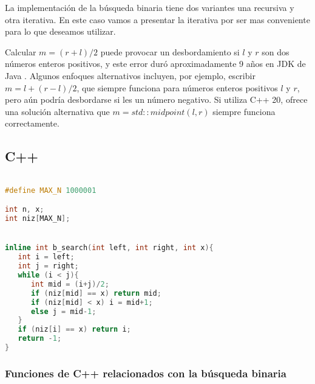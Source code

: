 La implementación de la búsqueda binaria tiene dos variantes una recursiva y otra iterativa. En este caso vamos a presentar la iterativa por ser mas conveniente para lo que deseamos utilizar.

Calcular  $m = (r + l) / 2$ puede provocar un desbordamiento si $l$ y $r$ son dos números enteros positivos, y este error duró aproximadamente 9 años en JDK de Java . Algunos enfoques alternativos incluyen, por ejemplo, escribir $m = l + (r - l) / 2$, que siempre funciona para números enteros positivos $l$ y $r$, pero aún podría desbordarse si les un número negativo. Si utiliza C++ 20, ofrece una solución alternativa que $m = std::midpoint(l, r)$ siempre funciona correctamente.

\subsection{C++}
\lstset{language=C++, breaklines=true, basicstyle=\footnotesize}
\begin{lstlisting}[language=C++]

#define MAX_N 1000001

int n, x;
int niz[MAX_N];


inline int b_search(int left, int right, int x){
   int i = left;
   int j = right;
   while (i < j){
      int mid = (i+j)/2;
      if (niz[mid] == x) return mid;
      if (niz[mid] < x) i = mid+1;
      else j = mid-1;
   }
   if (niz[i] == x) return i;
   return -1;
}
\end{lstlisting}

\subsubsection{Funciones de C++ relacionados con la búsqueda binaria}

